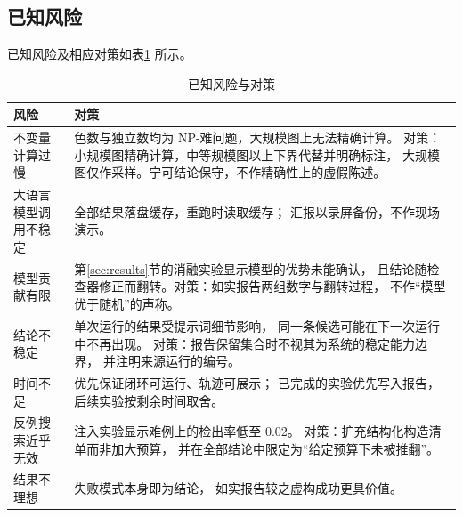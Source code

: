 \subsection{已知风险}

已知风险及相应对策如表\ref{tab:risks} 所示。

\begin{table}[H]
\centering
\footnotesize
\caption{已知风险与对策}
\label{tab:risks}
\begin{tabular}{@{}p{3.85cm}p{10.15cm}@{}}
\toprule
风险 & 对策 \\
\midrule
不变量计算过慢 & 色数与独立数均为 NP-难问题，大规模图上无法精确计算。
对策：小规模图精确计算，中等规模图以上下界代替并明确标注，
大规模图仅作采样。宁可结论保守，不作精确性上的虚假陈述。 \\
大语言模型调用不稳定 & 全部结果落盘缓存，重跑时读取缓存；
汇报以录屏备份，不作现场演示。 \\
模型贡献有限 & 第\ref{sec:results}节的消融实验显示模型的优势未能确认，
且结论随检查器修正而翻转。对策：如实报告两组数字与翻转过程，
不作“模型优于随机”的声称。 \\
结论不稳定 & 单次运行的结果受提示词细节影响，
同一条候选可能在下一次运行中不再出现。
对策：报告保留集合时不视其为系统的稳定能力边界，
并注明来源运行的编号。 \\
时间不足 & 优先保证闭环可运行、轨迹可展示；
已完成的实验优先写入报告，后续实验按剩余时间取舍。 \\
反例搜索近乎无效 & 注入实验显示难例上的检出率低至 0.02。
对策：扩充结构化构造清单而非加大预算，
并在全部结论中限定为“给定预算下未被推翻”。 \\
结果不理想 & 失败模式本身即为结论，
如实报告较之虚构成功更具价值。 \\
\bottomrule
\end{tabular}
\end{table}
